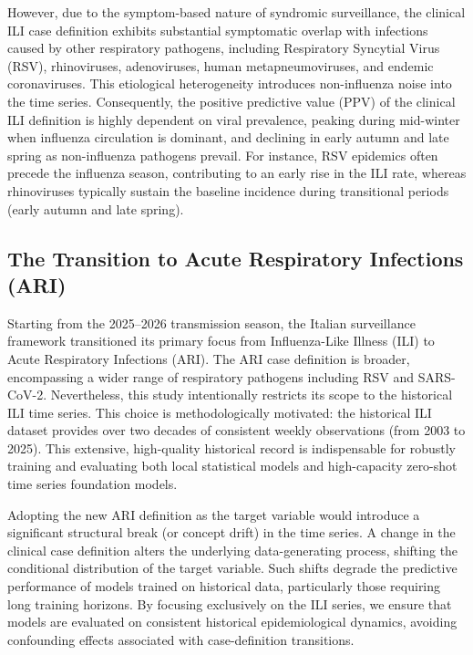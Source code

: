 However, due to the symptom-based nature of syndromic surveillance, the clinical ILI case definition exhibits substantial symptomatic overlap with infections caused by other respiratory pathogens, including Respiratory Syncytial Virus (RSV), rhinoviruses, adenoviruses, human metapneumoviruses, and endemic coronaviruses. This etiological heterogeneity introduces non-influenza noise into the time series. Consequently, the positive predictive value (PPV) of the clinical ILI definition is highly dependent on viral prevalence, peaking during mid-winter when influenza circulation is dominant, and declining in early autumn and late spring as non-influenza pathogens prevail. For instance, RSV epidemics often precede the influenza season, contributing to an early rise in the ILI rate, whereas rhinoviruses typically sustain the baseline incidence during transitional periods (early autumn and late spring).

\subsection{The Transition to Acute Respiratory Infections (ARI)}
Starting from the 2025--2026 transmission season, the Italian surveillance framework transitioned its primary focus from Influenza-Like Illness (ILI) to Acute Respiratory Infections (ARI). The ARI case definition is broader, encompassing a wider range of respiratory pathogens including RSV and SARS-CoV-2. Nevertheless, this study intentionally restricts its scope to the historical ILI time series. This choice is methodologically motivated: the historical ILI dataset provides over two decades of consistent weekly observations (from 2003 to 2025). This extensive, high-quality historical record is indispensable for robustly training and evaluating both local statistical models and high-capacity zero-shot time series foundation models.

Adopting the new ARI definition as the target variable would introduce a significant structural break (or concept drift) in the time series. A change in the clinical case definition alters the underlying data-generating process, shifting the conditional distribution of the target variable. Such shifts degrade the predictive performance of models trained on historical data, particularly those requiring long training horizons. By focusing exclusively on the ILI series, we ensure that models are evaluated on consistent historical epidemiological dynamics, avoiding confounding effects associated with case-definition transitions.

